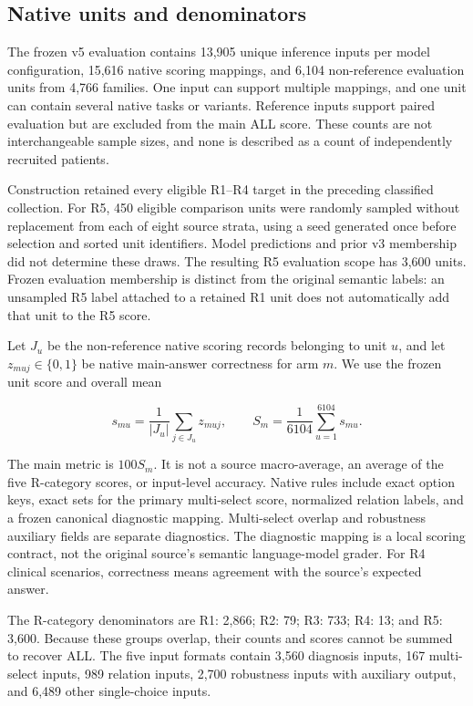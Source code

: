 \subsection{Native units and denominators}
\label{sec:task_contract-native-units-and-denominators}

The frozen v5 evaluation contains 13,905 unique inference inputs per model configuration,
15,616 native scoring mappings, and 6,104 non-reference evaluation units from 4,766
families. One input can support multiple mappings, and one unit can contain several native
tasks or variants. Reference inputs support paired evaluation but are excluded from the
main ALL score. These counts are not interchangeable sample sizes, and none is described
as a count of independently recruited patients.

Construction retained every eligible R1--R4 target in the preceding classified collection.
For R5, 450 eligible comparison units were randomly sampled without replacement from each
of eight source strata, using a seed generated once before selection and sorted unit
identifiers. Model predictions and prior v3 membership did not determine these draws. The
resulting R5 evaluation scope has 3,600 units. Frozen evaluation membership is distinct
from the original semantic labels: an unsampled R5 label attached to a retained R1 unit
does not automatically add that unit to the R5 score.

Let \(J_u\) be the non-reference native scoring records belonging to unit \(u\), and let
\(z_{muj}\in\{0,1\}\) be native main-answer correctness for arm \(m\). We use the frozen
unit score and overall mean

\begin{equation}
\label{eq:unit_score}
s_{mu}=\frac{1}{|J_u|}\sum_{j\in J_u}z_{muj},
\qquad
S_m=\frac{1}{6104}\sum_{u=1}^{6104}s_{mu}.
\end{equation}

The main metric is \(100S_m\). It is not a source macro-average, an average of the five
R-category scores, or input-level accuracy. Native rules include exact option keys, exact
sets for the primary multi-select score, normalized relation labels, and a frozen
canonical diagnostic mapping. Multi-select overlap and robustness auxiliary fields are
separate diagnostics. The diagnostic mapping is a local scoring contract, not the original
source's semantic language-model grader. For R4 clinical scenarios, correctness means
agreement with the source's expected answer.

The R-category denominators are R1: 2,866; R2: 79; R3: 733; R4: 13; and R5: 3,600. Because
these groups overlap, their counts and scores cannot be summed to recover ALL. The five
input formats contain 3,560 diagnosis inputs, 167 multi-select inputs, 989 relation
inputs, 2,700 robustness inputs with auxiliary output, and 6,489 other single-choice
inputs.

